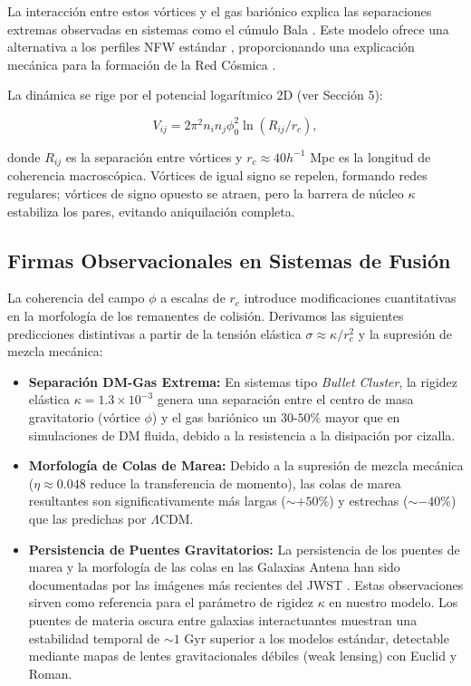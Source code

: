 \documentclass[11pt,a4paper]{article}
\begin{document}
La interacción entre estos vórtices y el gas bariónico explica las separaciones extremas observadas en sistemas como el cúmulo Bala \cite{BulletCluster2006}. Este modelo ofrece una alternativa a los perfiles NFW estándar \cite{NFW1996}, proporcionando una explicación mecánica para la formación de la Red Cósmica \cite{Bond1996}.

La dinámica se rige por el potencial logarítmico 2D (ver Sección 5):

\begin{equation}
	V_{ij} = 2\pi^2 n_i n_j \phi_0^2 \ln(R_{ij}/r_c),
\end{equation}

donde \( R_{ij} \) es la separación entre vórtices y \( r_c \approx 40 h^{-1} \) Mpc es la longitud de coherencia macroscópica. Vórtices de igual signo se repelen, formando redes regulares; vórtices de signo opuesto se atraen, pero la barrera de núcleo \( \kappa \) estabiliza los pares, evitando aniquilación completa.

\subsection{Firmas Observacionales en Sistemas de Fusión}

La coherencia del campo \( \phi \) a escalas de \( r_c \) introduce modificaciones cuantitativas en la morfología de los remanentes de colisión. Derivamos las siguientes predicciones distintivas a partir de la tensión elástica \( \sigma \approx \kappa / r_c^2 \) y la supresión de mezcla mecánica:

\begin{itemize}
	\item \textbf{Separación DM-Gas Extrema:} En sistemas tipo \textit{Bullet Cluster}, la rigidez elástica \( \kappa = 1.3 \times 10^{-3} \) genera una separación entre el centro de masa gravitatorio (vórtice \( \phi \)) y el gas bariónico un $30$-$50\%$ mayor que en simulaciones de DM fluida, debido a la resistencia a la disipación por cizalla.
	
	\item \textbf{Morfología de Colas de Marea:} Debido a la supresión de mezcla mecánica (\( \eta \approx 0.048 \) reduce la transferencia de momento), las colas de marea resultantes son significativamente más largas (\( \sim +50\% \)) y estrechas (\( \sim -40\% \)) que las predichas por $\Lambda$CDM.
	
	\item \textbf{Persistencia de Puentes Gravitatorios:} La persistencia de los puentes de marea y la morfología de las colas en las Galaxias Antena han sido documentadas por las imágenes más recientes del JWST \cite{JWST_Galaxies, JWST_Antennae}. Estas observaciones sirven como referencia para el parámetro de rigidez $\kappa$ en nuestro modelo. Los puentes de materia oscura entre galaxias interactuantes muestran una estabilidad temporal de \( \sim 1 \) Gyr superior a los modelos estándar, detectable mediante mapas de lentes gravitacionales débiles (weak lensing) con Euclid y Roman.
\end{itemize}
\end{document}
